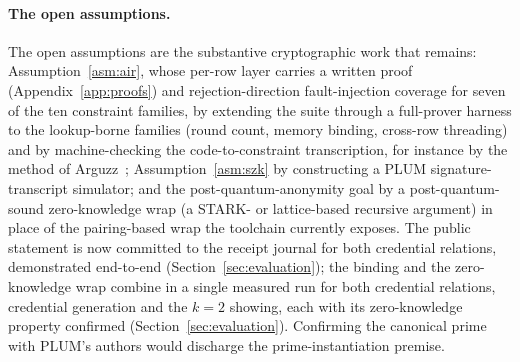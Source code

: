 \paragraph{The open assumptions.}
The open assumptions are the substantive cryptographic work that remains: Assumption~\ref{asm:air}, whose per-row layer carries a written proof (Appendix~\ref{app:proofs}) and rejection-direction fault-injection coverage for seven of the ten constraint families, by extending the suite through a full-prover harness to the lookup-borne families (round count, memory binding, cross-row threading) and by machine-checking the code-to-constraint transcription, for instance by the method of Arguzz~\cite{hochrainer2025arguzz}; Assumption~\ref{asm:szk} by constructing a PLUM signature-transcript simulator; and the post-quantum-anonymity goal by a post-quantum-sound zero-knowledge wrap (a STARK- or lattice-based recursive argument) in place of the pairing-based wrap the toolchain currently exposes. The public statement is now committed to the receipt journal for both credential relations, demonstrated end-to-end (Section~\ref{sec:evaluation}); the binding and the zero-knowledge wrap combine in a single measured run for both credential relations, credential generation and the $k=2$ showing, each with its zero-knowledge property confirmed (Section~\ref{sec:evaluation}). Confirming the canonical prime with PLUM's authors would discharge the prime-instantiation premise.

